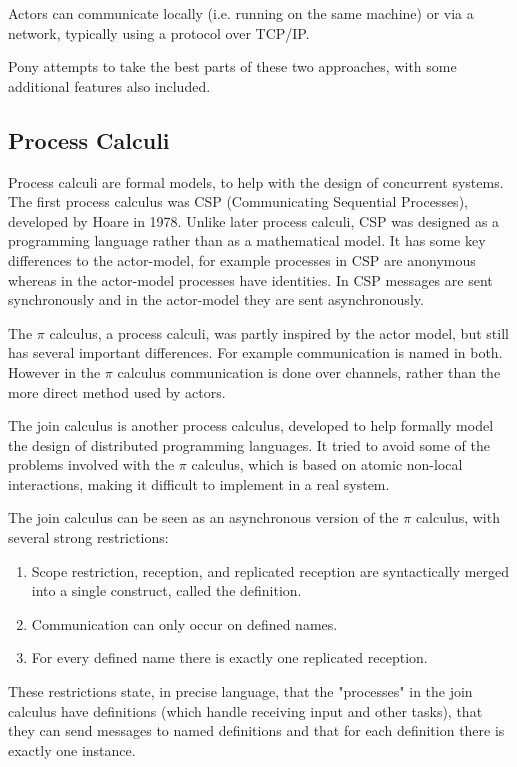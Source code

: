 \documentclass[pdftex,11pt,a4paper]{report}
\begin{document}
Actors can communicate locally (i.e. running on the same machine) or via a network, typically using a protocol over TCP/IP.

Pony attempts to take the best parts of these two approaches, with some additional features also included.

\subsection{Process Calculi}

Process calculi are formal models, to help with the design of concurrent systems.
The first process calculus was CSP (Communicating Sequential Processes), developed by Hoare in 1978\cite{hoare1978}.
Unlike later process calculi, CSP was designed as a programming language rather than as a mathematical model.
It has some key differences to the actor-model, for example processes in CSP are anonymous whereas in the actor-model processes have identities.
In CSP messages are sent synchronously and in the actor-model they are sent asynchronously.

The $\pi$ calculus, a process calculi, was partly inspired by the actor model, but still has several important differences.
For example communication is named in both.
However in the $\pi$ calculus communication is done over channels, rather than the more direct method used by actors.

The join calculus is another process calculus, developed to help formally model the design of distributed programming languages\cite{fournet1996}.
It tried to avoid some of the problems involved with the $\pi$ calculus\cite{milner1989}, which is based on atomic non-local interactions, making it difficult to implement in a real system.

The join calculus can be seen as an asynchronous version of the $\pi$ calculus, with several strong restrictions\cite{fournet1996}:
\begin{enumerate}[noitemsep]
	\item Scope restriction, reception, and replicated reception are syntactically merged into a single construct, called the definition.
	\item Communication can only occur on defined names.
	\item For every defined name there is exactly one replicated reception.
\end{enumerate}

These restrictions state, in precise language, that the "processes" in the join calculus have definitions (which handle receiving input and other tasks), that they can send messages to named definitions and that for each definition there is exactly one instance.
\end{document}
